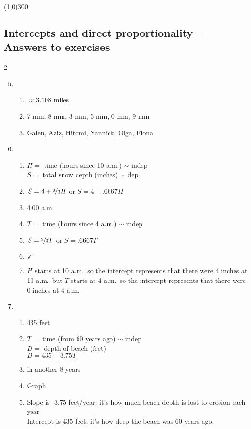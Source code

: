 \bigskip 

\begin{center}
\line(1,0){300} %
\end{center}

\subsection {Intercepts and direct proportionality -- Answers to exercises} %

\begin{multicols} {2}
\begin{enumerate}
\setcounter{enumi}{4}

\item %
\begin{enumerate}
\item $\approx 3.108$ miles
\item 7 min, 8 min, 3 min, 5 min, 0 min, 9 min
\item Galen, Aziz, Hitomi, Yannick, Olga, Fiona
\end{enumerate}

\item %
\begin{enumerate}
\item $H=$ time (hours since 10 a.m.) $\sim$ indep \\ $S=$ total snow depth (inches) $\sim$ dep 
\item $S=4+\nicefrac{2}{3}H$ or $S=4+.6667H$
\item 4:00 a.m.
\item $T=$ time (hours since 4 a.m.) $\sim$ indep
\item $S=\nicefrac{2}{3}T$ or $S=.6667T$
\item $\checkmark$
\item $H$ starts at 10 a.m.\ so the intercept represents that there were 4 inches at 10 a.m.\  but $T$ starts at 4 a.m.\ so the intercept represents that there were 0 inches at 4 a.m. 
\end{enumerate}

\item %
\begin{enumerate}
\item 435 feet
\item $T=$ time (from 60 years ago) $\sim$ indep \\ $D=$ depth of beach (feet) \\ $D=435 - 3.75T$
\item in another 8 years
\item Graph
\item Slope is -3.75 feet/year; it's how much beach depth is lost to erosion each year \\ Intercept is 435 feet; it's how deep the beach was 60 years ago.
\end{enumerate}


\end{enumerate}
\end{multicols}
